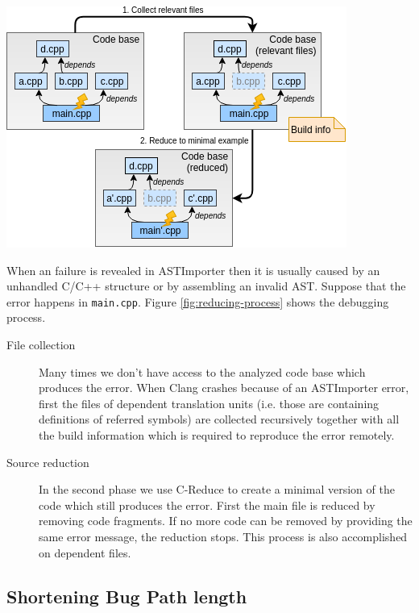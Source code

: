 \documentclass[a0,portrait]{a0poster}
\begin{document}
\begin{multicols}{2}
\begin{center}\vspace{1cm}
\includegraphics[width=0.8\linewidth]{reducing_process}
\label{fig:reducing-process}
\end{center}\vspace{1cm}

When an failure is revealed in ASTImporter then it is usually caused by an 
unhandled C/C++ structure or by assembling an invalid AST. Suppose that the 
error happens in \texttt{main.cpp}. Figure \ref{fig:reducing-process} shows the 
debugging process.
\begin{description}
  \item[File collection] Many times we don't have access to the analyzed code 
  base which produces the error. When Clang crashes because of an ASTImporter 
  error, first the files of dependent translation units (i.e. those are 
  containing definitions of referred symbols) are collected recursively 
  together with all the build information which is required to reproduce the 
  error remotely.
  
  \item[Source reduction] In the second phase we use C-Reduce \cite{creduce} to 
  create a minimal version of the code which still produces the error. First 
  the main file is reduced by removing code fragments. If no more code can be 
  removed by providing the same error message, the reduction stops. This 
  process is also accomplished on dependent files.
\end{description}


\subsection*{Shortening Bug Path length}


\end{multicols}
\end{document}
